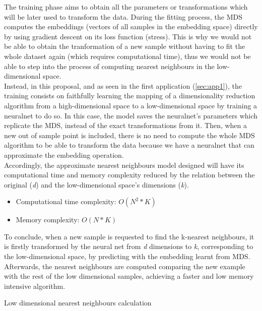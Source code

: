 \documentclass[a4paper,11pt,spanish]{report}
\makeatletter
\def\BState{\State\hskip-\ALG@thistlm}
\makeatother
\begin{document}
The training phase aims to obtain all the parameters or transformations which will be later used to transform the data. During the fitting process, the MDS computes the embeddings (vectors of all samples in the embedding space) directly by using gradient descent on its loss function (stress). This is why we would not be able to obtain the tranformation of a new sample without having to fit the whole dataset again (which requires computational time), thus we would not be able to step into the process of computing nearest neighbours in the low-dimensional space.\\
Instead, in this proposal, and as seen in the first application (\ref{sec:app1}), the training consists on faithfully learning the mapping of a dimensionality reduction algorithm from a high-dimensional space to a low-dimensional space by training a neuralnet to do so. In this case, the model saves the neuralnet's parameters which replicate the MDS, instead of the exact transformations from it. Then, when a new out of sample point is included, there is no need to compute the whole MDS algorithm to be able to transform the data because we have a neuralnet that can approximate the embedding operation.\\
Accordingly, the approximate nearest neighbours model designed will have its computational time and memory complexity reduced by the relation between the original (\textit{d}) and the low-dimensional space's dimensions (\textit{k}).
\begin{itemize}
\item Computational time complexity: $O(N^{2}*K)$
\item Memory complexity: $O(N*K)$
\end{itemize}

To conclude, when a new sample is requested to find the k-nearest neighbours, it is firstly transformed by the neural net from \textit{d} dimensions to \textit{k}, corresponding to the low-dimensional space, by predicting with the embedding learnt from MDS. Afterwards, the nearest neighbours are computed comparing the new example with the rest of the low  dimensional samples, achieving a faster and low memory intensive algorithm.\\

\begin{algorithm}
\caption{Low dimensional nearest neighbours calculation}
\end{algorithm}
\hfill
\end{document}
